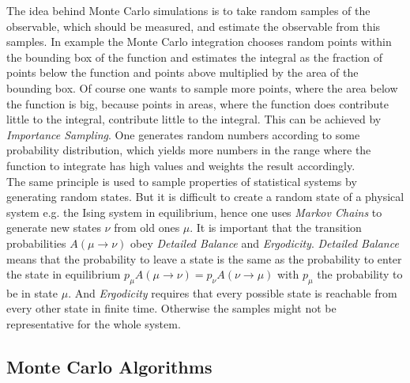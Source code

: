 \label{sec:montecarlo}
The idea behind Monte Carlo simulations is to take random samples of
the observable, which should be measured, and estimate the observable from
this samples. In example the Monte Carlo integration chooses random
points within the bounding box of the function and estimates the integral
as the fraction of points below the function and points above multiplied
by the area of the bounding box.
Of course one wants to sample more points, where the area below the
function is big, because points in areas, where the function does
contribute little to the integral, contribute little to the integral.
This can be achieved by \emph{Importance Sampling}. One
generates random numbers according to some probability distribution, which
yields more numbers in the range where the function to integrate has high
values and weights the result accordingly.\\
The same principle is used to sample properties of statistical systems
by generating random states.
But it is difficult to create a random state of a physical system e.g. the
Ising system in equilibrium, hence one uses \emph{Markov Chains} to
generate new states \(\nu\) from old ones \(\mu\).
It is important that the transition probabilities \(A(\mu \to \nu)\)
obey \emph{Detailed Balance} and \emph{Ergodicity}.
\emph{Detailed Balance} means  that the probability to leave a state is
the same as the probability to enter the state in equilibrium
\(p_\mu A(\mu \to \nu) = p_\nu A(\nu \to \mu)\) with \(p_\mu\) the
probability to be in state \(\mu\).
And \emph{Ergodicity} requires that every possible state is reachable
from every other state in finite time. \cite{NewmanBarkema1999} \cite{Katzgraber2011}
Otherwise the samples might not be representative for the whole system.\\

\subsection{Monte Carlo Algorithms}
